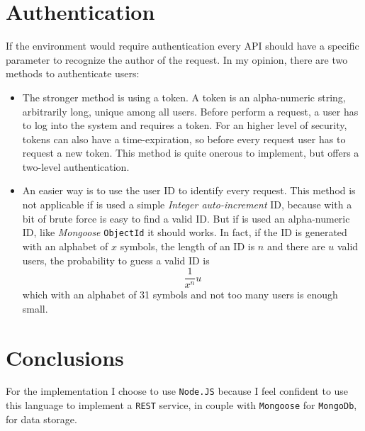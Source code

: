 \documentclass[a4paper]{article}
\begin{document}
\section{Authentication}
If the environment would require authentication every API should have a specific parameter to recognize the author of the request. In my opinion, there are two methods to authenticate users:
\begin{itemize}
\item The stronger method is using a token. A token is an alpha-numeric string, arbitrarily long, unique among all users. Before perform a request, a user has to log into the system and requires a token. For an higher level of security, tokens can also have a time-expiration, so before every request user has to request a new token. This method is quite onerous to implement, but offers a two-level authentication.
\item An easier way is to use the user ID to identify every request. This method is not applicable if is used a simple \textit{Integer auto-increment} ID, because with a bit of brute force is easy to find a valid ID. But if is used an alpha-numeric ID, like \textit{Mongoose} \texttt{ObjectId} it should works. In fact, if the ID is generated with an alphabet of $x$ symbols, the length of an ID is $n$ and there are $u$ valid users, the probability to guess a valid ID is 
\[
\frac{1}{x^n} u
\]
which with an alphabet of 31 symbols and not too many users is enough small.
\end{itemize}

\section{Conclusions}
For the implementation I choose to use \texttt{Node.JS} because I feel confident to use this language to implement a \texttt{REST} service, in couple with \texttt{Mongoose} for \texttt{MongoDb}, for data storage.
\end{document}
